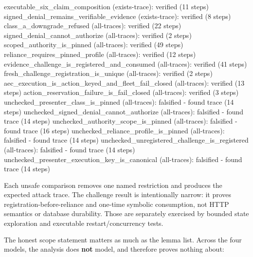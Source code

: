 \documentclass[11pt]{article}
\begin{document}
\begin{tool}
executable_six_claim_composition (exists-trace): verified (11 steps)
signed_denial_remains_verifiable_evidence (exists-trace): verified (8 steps)
class_a_downgrade_refused (all-traces): verified (22 steps)
signed_denial_cannot_authorize (all-traces): verified (2 steps)
scoped_authority_is_pinned (all-traces): verified (49 steps)
reliance_requires_pinned_profile (all-traces): verified (12 steps)
evidence_challenge_is_registered_and_consumed (all-traces): verified (41 steps)
fresh_challenge_registration_is_unique (all-traces): verified (2 steps)
aec_execution_is_action_keyed_and_fleet_fail_closed (all-traces): verified (13 steps)
action_reservation_failure_is_fail_closed (all-traces): verified (3 steps)
unchecked_presenter_class_is_pinned (all-traces): falsified - found trace (14 steps)
unchecked_signed_denial_cannot_authorize (all-traces): falsified - found trace (14 steps)
unchecked_authority_scope_is_pinned (all-traces): falsified - found trace (16 steps)
unchecked_reliance_profile_is_pinned (all-traces): falsified - found trace (14 steps)
unchecked_unregistered_challenge_is_registered (all-traces): falsified - found trace (14 steps)
unchecked_presenter_execution_key_is_canonical (all-traces): falsified - found trace (14 steps)
\end{tool}

Each unsafe comparison removes one named restriction and produces the expected
attack trace. The challenge result is intentionally narrow: it proves
registration-before-reliance and one-time symbolic consumption, not HTTP
semantics or database durability. Those are separately exercised by bounded
state exploration and executable restart/concurrency tests.

The honest scope statement matters as much as the lemma list. Across the four
models, the analysis does \textbf{not} model, and therefore proves nothing about:
\end{document}
